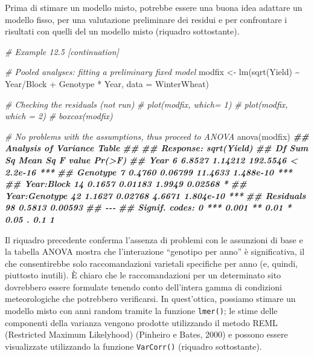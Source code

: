 \documentclass[
  12pt,
]{book}
\newenvironment{Shaded}{\begin{snugshade}}{\end{snugshade}}
\newcommand{\AttributeTok}[1]{\textcolor[rgb]{0.77,0.63,0.00}{#1}}
\newcommand{\CommentTok}[1]{\textcolor[rgb]{0.56,0.35,0.01}{\textit{#1}}}
\newcommand{\DocumentationTok}[1]{\textcolor[rgb]{0.56,0.35,0.01}{\textbf{\textit{#1}}}}
\newcommand{\FunctionTok}[1]{\textcolor[rgb]{0.00,0.00,0.00}{#1}}
\newcommand{\NormalTok}[1]{#1}
\newcommand{\OtherTok}[1]{\textcolor[rgb]{0.56,0.35,0.01}{#1}}
\newcommand{\SpecialCharTok}[1]{\textcolor[rgb]{0.00,0.00,0.00}{#1}}
\begin{document}
Prima di stimare un modello misto, potrebbe essere una buona idea adattare un modello fisso, per una valutazione preliminare dei residui e per confrontare i risultati con quelli del un modello misto (riquadro sottostante).

\begin{Shaded}
\begin{Highlighting}[]
\CommentTok{\# Example 12.5 [continuation]}

\CommentTok{\# Pooled analyses: fitting a preliminary fixed model}
\NormalTok{modfix }\OtherTok{\textless{}{-}} \FunctionTok{lm}\NormalTok{(}\FunctionTok{sqrt}\NormalTok{(Yield) }\SpecialCharTok{\textasciitilde{}}\NormalTok{ Year}\SpecialCharTok{/}\NormalTok{Block }\SpecialCharTok{+}\NormalTok{ Genotype }\SpecialCharTok{*}\NormalTok{ Year,}
             \AttributeTok{data =}\NormalTok{ WinterWheat)}

\CommentTok{\# Checking the residuals (not run)}
\CommentTok{\# plot(modfix, which= 1)}
\CommentTok{\# plot(modfix, which = 2)}
\CommentTok{\# boxcox(modfix)}

\CommentTok{\# No problems with the assumptions, thus proceed to ANOVA}
\FunctionTok{anova}\NormalTok{(modfix)}
\DocumentationTok{\#\# Analysis of Variance Table}
\DocumentationTok{\#\# }
\DocumentationTok{\#\# Response: sqrt(Yield)}
\DocumentationTok{\#\#               Df Sum Sq Mean Sq  F value    Pr(\textgreater{}F)    }
\DocumentationTok{\#\# Year           6 6.8527 1.14212 192.5546 \textless{} 2.2e{-}16 ***}
\DocumentationTok{\#\# Genotype       7 0.4760 0.06799  11.4633 1.488e{-}10 ***}
\DocumentationTok{\#\# Year:Block    14 0.1657 0.01183   1.9949   0.02568 *  }
\DocumentationTok{\#\# Year:Genotype 42 1.1627 0.02768   4.6671 1.804e{-}10 ***}
\DocumentationTok{\#\# Residuals     98 0.5813 0.00593                       }
\DocumentationTok{\#\# {-}{-}{-}}
\DocumentationTok{\#\# Signif. codes:  0 \textquotesingle{}***\textquotesingle{} 0.001 \textquotesingle{}**\textquotesingle{} 0.01 \textquotesingle{}*\textquotesingle{} 0.05 \textquotesingle{}.\textquotesingle{} 0.1 \textquotesingle{} \textquotesingle{} 1}
\end{Highlighting}
\end{Shaded}

Il riquadro precedente conferma l'assenza di problemi con le assunzioni di base e la tabella ANOVA mostra che l'interazione ``genotipo per anno'' è significativa, il che consentirebbe solo raccomandazioni varietali specifiche per anno (e, quindi, piuttosto inutili). È chiaro che le raccomandazioni per un determinato sito dovrebbero essere formulate tenendo conto dell'intera gamma di condizioni meteorologiche che potrebbero verificarsi. In quest'ottica, possiamo stimare un modello misto con anni random tramite la funzione \texttt{lmer()}; le stime delle componenti della varianza vengono prodotte utilizzando il metodo REML (Restricted Maximum Likelyhood) (Pinheiro e Bates, 2000) e possono essere visualizzate utilizzando la funzione \texttt{VarCorr()} (riquadro sottostante).
\end{document}
